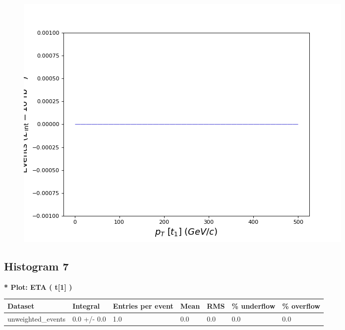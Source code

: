 \documentclass[a4paper, 10pt]{article}
\begin{document}
\begin{figure}[H]
  \begin{center}
    \includegraphics[scale=0.45]{selection_5.png}\\
\caption{   }
  \end{center}
\end{figure}
      \newpage
\subsection{ Histogram 7}

\textbf{* Plot: ETA ( t[1] ) }\\
   \begin{table}[H]
  \begin{center}
    \begin{tabular}{|m{23.0mm}|m{23.0mm}|m{18.0mm}|m{19.0mm}|m{19.0mm}|m{19.0mm}|m{19.0mm}|}
      \hline
      {\cellcolor{yellow}         Dataset}& {\cellcolor{yellow}         Integral}& {\cellcolor{yellow}         Entries per event}& {\cellcolor{yellow}         Mean}& {\cellcolor{yellow}         RMS}& {\cellcolor{yellow}         \% underflow}& {\cellcolor{yellow}         \% overflow}\\
      \hline
      {\cellcolor{white}         unweighted\_events}& {\cellcolor{white}         0.0 +/\-- 0.0}& {\cellcolor{white}         1.0}& {\cellcolor{white}         0.0}& {\cellcolor{white}         0.0}& {\cellcolor{green}         0.0}& {\cellcolor{green}         0.0}\\
\hline
    \end{tabular}
  \end{center}
\end{table}
\end{document}
